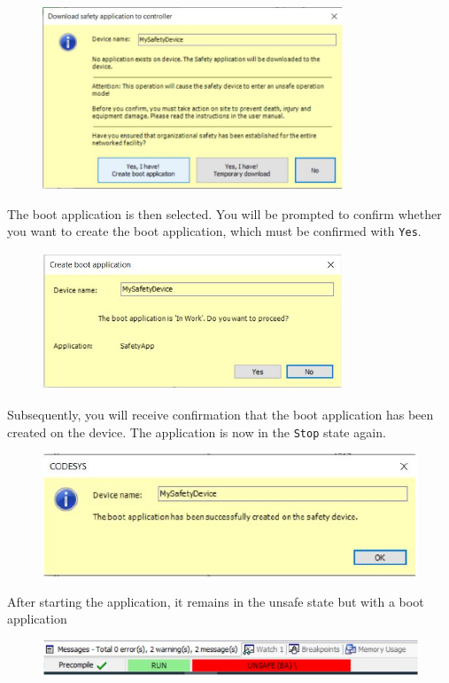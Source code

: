 \documentclass[a4paper,12pt]{article}
\begin{document}
\begin{figure}[H]
	\centering
	\includegraphics[width=0.8\textwidth]{e14.JPG}
\end{figure}
The boot application is then selected. You will be prompted to confirm whether you want to create the boot application, which must be confirmed with \texttt{Yes}. 
\begin{figure}[H]
	\centering
	\includegraphics[width=0.8\textwidth]{e15.JPG}
\end{figure}
Subsequently, you will receive confirmation that the boot application has been created on the device. The application is now in the \texttt{Stop} state again.
\begin{figure}[H]
	\centering
	\includegraphics[width=1\textwidth]{e16.JPG}
\end{figure}
 After starting the application, it remains in the unsafe state but with a boot application
\begin{figure}[H]
	\centering
	\includegraphics[width=1\textwidth]{e17.JPG}
\end{figure}
\end{document}

